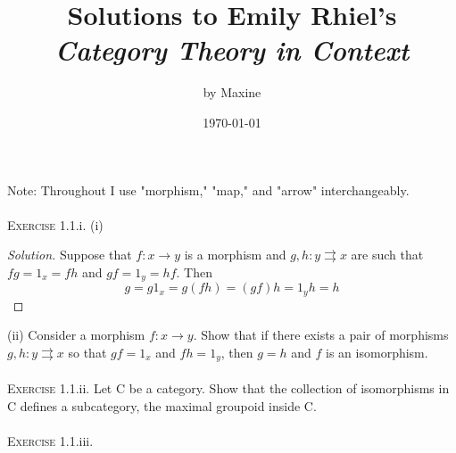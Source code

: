 \documentclass{article}
\title{Solutions to Emily Rhiel's \textit{Category Theory in Context}}
\author{by Maxine}
\date{\today}
\newcommand{\cat}[1]{\textsf{#1}}
\newenvironment{solution}{\begin{proof}[Solution]}{\end{proof}}
\begin{document}
\maketitle

\large 
\vspace{0.05in}
\noindent 
Note: Throughout I use "morphism," "map," and "arrow" interchangeably. \\ \\
\textsc{Exercise} 1.1.i. (i) 
\begin{solution}
    Suppose that $f: x \to y$ is a morphism and $g,h: y \rightrightarrows x$ are such that $fg= 1_x = fh$ and $gf = 1_y = hf$. Then
    \[
        g = g 1_x = g (fh) = (gf) h = 1_y h = h
    \]
\end{solution}
\noindent (ii) Consider a morphism $f: x \to y$. Show that if there exists a pair of morphisms $g,h: y \rightrightarrows x$ so that $gf = 1_x$ and $fh = 1_y$, then $g=h$ and $f$ is an isomorphism. \\ \\
\textsc{Exercise} 1.1.ii. 
Let \cat{C} be a category. Show that the collection of isomorphisms in \cat{C} defines a subcategory, the maximal groupoid inside \cat{C}. \\ \\
\textsc{Exercise} 1.1.iii.
\end{document}
